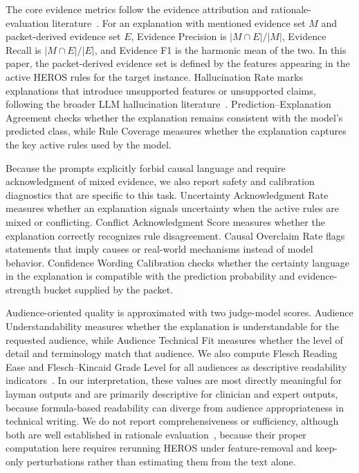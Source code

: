 \documentclass[sigconf,nonacm]{acmart}
\begin{document}
The core evidence metrics follow the evidence attribution and rationale-evaluation literature~\cite{deyoung2020eraser,xing2025evidence}. For an explanation with mentioned evidence set $M$ and packet-derived evidence set $E$, Evidence Precision is $\lvert M \cap E \rvert / \lvert M \rvert$, Evidence Recall is $\lvert M \cap E \rvert / \lvert E \rvert$, and Evidence F1 is the harmonic mean of the two. In this paper, the packet-derived evidence set is defined by the features appearing in the active HEROS rules for the target instance. Hallucination Rate marks explanations that introduce unsupported features or unsupported claims, following the broader LLM hallucination literature~\cite{bang2025hallulens}. Prediction--Explanation Agreement checks whether the explanation remains consistent with the model's predicted class, while Rule Coverage measures whether the explanation captures the key active rules used by the model.

Because the prompts explicitly forbid causal language and require acknowledgment of mixed evidence, we also report safety and calibration diagnostics that are specific to this task. Uncertainty Acknowledgment Rate measures whether an explanation signals uncertainty when the active rules are mixed or conflicting. Conflict Acknowledgment Score measures whether the explanation correctly recognizes rule disagreement. Causal Overclaim Rate flags statements that imply causes or real-world mechanisms instead of model behavior. Confidence Wording Calibration checks whether the certainty language in the explanation is compatible with the prediction probability and evidence-strength bucket supplied by the packet.

Audience-oriented quality is approximated with two judge-model scores. Audience Understandability measures whether the explanation is understandable for the requested audience, while Audience Technical Fit measures whether the level of detail and terminology match that audience. We also compute Flesch Reading Ease and Flesch--Kincaid Grade Level for all audiences as descriptive readability indicators~\cite{flesch1948readability,kincaid1975derivation}. In our interpretation, these values are most directly meaningful for layman outputs and are primarily descriptive for clinician and expert outputs, because formula-based readability can diverge from audience appropriateness in technical writing. We do not report comprehensiveness or sufficiency, although both are well established in rationale evaluation~\cite{deyoung2020eraser}, because their proper computation here requires rerunning HEROS under feature-removal and keep-only perturbations rather than estimating them from the text alone.
\end{document}
